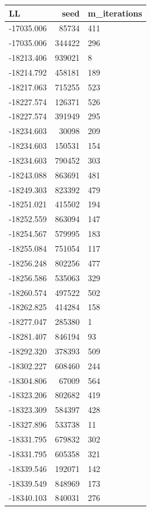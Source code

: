\documentclass[]{book}
\theoremstyle{definition}
\theoremstyle{definition}
\theoremstyle{definition}
\theoremstyle{remark}
\begin{document}
\begin{tabular}{l|r|l}
\hline
LL & seed & m\_iterations\\
\hline
-17035.006 & 85734 & 411\\
\hline
-17035.006 & 344422 & 296\\
\hline
-18213.406 & 939021 & 8\\
\hline
-18214.792 & 458181 & 189\\
\hline
-18217.063 & 715255 & 523\\
\hline
-18227.574 & 126371 & 526\\
\hline
-18227.574 & 391949 & 295\\
\hline
-18234.603 & 30098 & 209\\
\hline
-18234.603 & 150531 & 154\\
\hline
-18234.603 & 790452 & 303\\
\hline
-18243.088 & 863691 & 481\\
\hline
-18249.303 & 823392 & 479\\
\hline
-18251.021 & 415502 & 194\\
\hline
-18252.559 & 863094 & 147\\
\hline
-18254.567 & 579995 & 183\\
\hline
-18255.084 & 751054 & 117\\
\hline
-18256.248 & 802256 & 477\\
\hline
-18256.586 & 535063 & 329\\
\hline
-18260.574 & 497522 & 502\\
\hline
-18262.825 & 414284 & 158\\
\hline
-18277.047 & 285380 & 1\\
\hline
-18281.407 & 846194 & 93\\
\hline
-18292.320 & 378393 & 509\\
\hline
-18302.227 & 608460 & 244\\
\hline
-18304.806 & 67009 & 564\\
\hline
-18323.206 & 802682 & 419\\
\hline
-18323.309 & 584397 & 428\\
\hline
-18327.896 & 533738 & 11\\
\hline
-18331.795 & 679832 & 302\\
\hline
-18331.795 & 605358 & 321\\
\hline
-18339.546 & 192071 & 142\\
\hline
-18339.549 & 848969 & 173\\
\hline
-18340.103 & 840031 & 276\\

\end{tabular}
\end{document}
